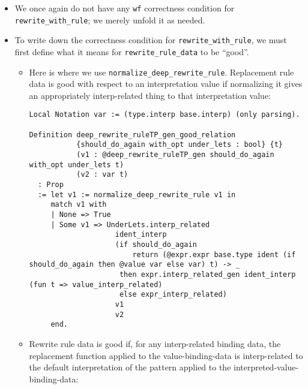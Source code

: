 \documentclass[
]{article}
\providecommand{\tightlist}{%
  \setlength{\itemsep}{0pt}\setlength{\parskip}{0pt}}
\begin{document}
\begin{itemize}
\begin{itemize}
    \begin{itemize}
    \tightlist
    \item
      We once again do not have any \texttt{wf} correctness condition
      for \texttt{rewrite\_with\_rule}; we merely unfold it as needed.
    \item
      To write down the correctness condition for
      \texttt{rewrite\_with\_rule}, we must first define what it means
      for \texttt{rewrite\_rule\_data} to be ``good''.

      \begin{itemize}
      \item
        Here is where we use \texttt{normalize\_deep\_rewrite\_rule}.
        Replacement rule data is good with respect to an interpretation
        value if normalizing it gives an appropriately interp-related
        thing to that interpretation value:

\begin{verbatim}
Local Notation var := (type.interp base.interp) (only parsing).

Definition deep_rewrite_ruleTP_gen_good_relation
           {should_do_again with_opt under_lets : bool} {t}
           (v1 : @deep_rewrite_ruleTP_gen should_do_again with_opt under_lets t)
           (v2 : var t)
  : Prop
  := let v1 := normalize_deep_rewrite_rule v1 in
     match v1 with
     | None => True
     | Some v1 => UnderLets.interp_related
                    ident_interp
                    (if should_do_again
                        return (@expr.expr base.type ident (if should_do_again then @value var else var) t) -> _
                     then expr.interp_related_gen ident_interp (fun t => value_interp_related)
                     else expr_interp_related)
                    v1
                    v2
     end.
\end{verbatim}
      \item
        Rewrite rule data is good if, for any interp-related binding
        data, the replacement function applied to the value-binding-data
        is interp-related to the default interpretation of the pattern
        applied to the interpreted-value-binding-data:


\end{itemize}
\end{itemize}
\end{itemize}
\end{itemize}
\end{document}

